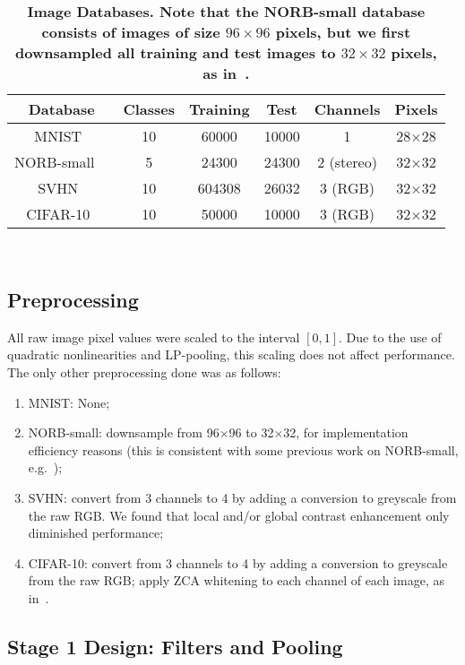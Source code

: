\documentclass[conference]{IEEEtran}
\begin{document}
\begin{table}[!ht]
{\footnotesize
\begin{tabular}{|c|c|c|c|c|c|}
\hline
Database & Classes & Training & Test  & Channels & Pixels\\
\hline
MNIST~\cite{MNIST} & 10 & 60000 & 10000 & 1 & 28$\times$28\\
NORB-small~\cite{LeCun.04}\ & 5 & 24300 & 24300 & 2 (stereo) & 32$\times$32\\
SVHN~\cite{SVHN}  & 10 & 604308 & 26032 &  3 (RGB) & 32$\times$32\\
CIFAR-10~\cite{Krizhevsky} & 10 & 50000 & 10000 & 3 (RGB) & 32$\times$32\\
\hline
\end{tabular}
~\\
\caption{\bf{Image Databases. Note that the NORB-small database consists of images of size $96 \times 96$ pixels, but we first downsampled all training and test images to $32 \times 32$ pixels, as in~\cite{Le.10}.}}\label{Table1}
}
\end{table}

\subsection{Preprocessing}

All raw image pixel values were scaled to the interval $[0,1]$. Due to the use of quadratic nonlinearities and LP-pooling, this scaling does not affect performance. The only other preprocessing done was as follows:
\begin{enumerate}
\item MNIST: None;
\item NORB-small: downsample from 96$\times$96 to 32$\times$32, for implementation efficiency reasons (this is consistent with some previous work on NORB-small, e.g.~\cite{Le.10});
\item SVHN: convert from 3 channels to 4 by adding a conversion to greyscale from the raw RGB. We found that local and/or global contrast enhancement only diminished performance;
\item CIFAR-10: convert from 3 channels to 4 by adding a conversion to greyscale from the raw RGB; apply ZCA whitening to each channel of each image, as in~\cite{Coates.11}.
\end{enumerate}


\subsection{Stage 1 Design: Filters and Pooling}\label{S:s1design}\label{S:filters}
\end{document}
